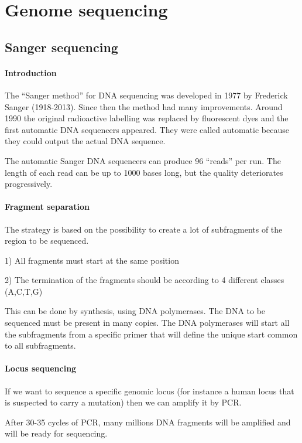 \section{Genome sequencing}

\subsection{Sanger sequencing}

\paragraph*{Introduction}
The ``Sanger method'' for DNA sequencing was developed in 1977 by  Frederick
Sanger (1918-2013).
Since then the method had many improvements.
Around 1990 the original radioactive labelling was replaced by fluorescent
dyes and the first automatic DNA sequencers appeared. 
They were called automatic because they could output the actual DNA sequence.

The automatic Sanger DNA sequencers can produce 96 ``reads'' per run. 
The length of each read can be up to 1000 bases long, but the quality
deteriorates  progressively.


\paragraph*{Fragment separation}

The strategy is based on the possibility to create a lot of subfragments of
the region to be sequenced.

1) All fragments must start at the same position 

2) The termination of the fragments should be according to 4 different
classes (A,C,T,G)

This can be done by synthesis, using DNA polymerases. 
The DNA to be sequenced must be present in many copies. 
The DNA polymerases will start all the subfragments from a specific primer
that will define the unique start common to all subfragments.


\paragraph*{Locus sequencing}

If we want to sequence a specific genomic locus (for instance a human
locus that is suspected to carry a mutation) then we can amplify it
by PCR.

After 30-35 cycles of PCR, many millions DNA fragments will be amplified
and will be ready for sequencing. \\

